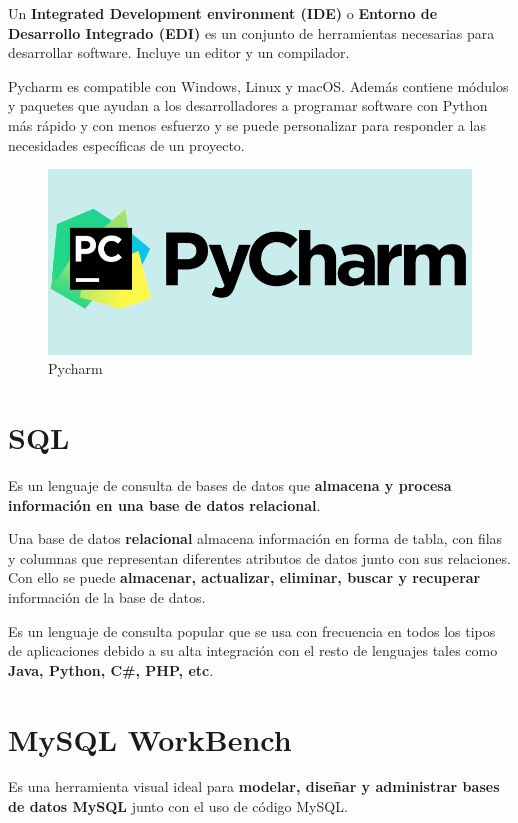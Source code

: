 \documentclass[a4paper, 12pt]{book}
\begin{document}
Un \textbf{Integrated Development environment (IDE)} o \textbf{Entorno de Desarrollo Integrado (EDI)} es un conjunto de herramientas necesarias para desarrollar software. Incluye un editor y un compilador.


Pycharm es compatible con Windows, Linux y macOS. Además contiene módulos y paquetes que ayudan a los desarrolladores a programar software con Python más rápido y con menos esfuerzo y se puede personalizar para responder a las necesidades específicas de un proyecto.

\begin{figure}[hb]
	\centering
	\includegraphics[width=14cm, keepaspectratio]{img/pycharm.png}
	\caption{Pycharm}
	\label{fig:pycharm}
\end{figure}

\section{SQL} 
\label{sec:sql}
Es un lenguaje de consulta de bases de datos que \textbf{almacena y procesa información en una base de datos relacional}. 

Una base de datos \textbf{relacional} almacena información en forma de tabla, con filas y columnas que representan diferentes atributos de datos junto con sus relaciones. Con ello se puede \textbf{almacenar, actualizar, eliminar, buscar y recuperar} información de la base de datos.

Es un lenguaje de consulta popular que se usa con frecuencia en todos los tipos de aplicaciones debido a su alta integración con el resto de lenguajes tales como \textbf{Java, Python, C\#, PHP, etc}.

\section{MySQL WorkBench} 
\label{sec:mysqlworkbench}

Es una herramienta visual ideal para \textbf{modelar, diseñar y administrar bases de datos MySQL} junto con el uso de código MySQL.
\end{document}
